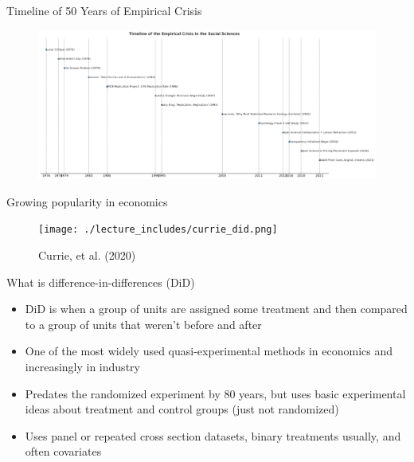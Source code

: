 \documentclass{beamer}
\begin{document}
\begin{frame}{Timeline of 50 Years of Empirical Crisis}

\begin{figure}
    \centering
    \includegraphics[height=0.9\textheight]{./lecture_includes/timeline}
\end{figure}

\end{frame}

\begin{frame}{Growing popularity in economics}

	\begin{figure}
	\caption{Currie, et al. (2020)}
	\texttt{[image: ./lecture\_includes/currie\_did.png]}
	\end{figure}


\end{frame}















\begin{frame}{What is difference-in-differences (DiD)}

\begin{itemize}
\item DiD is when a group of units are assigned some treatment and then compared to a group of units that weren't before and after
\item One of the most widely used quasi-experimental methods in economics and increasingly in industry
\item Predates the randomized experiment by 80 years, but uses basic experimental ideas about treatment and control groups (just not randomized)
\item Uses panel or repeated cross section datasets, binary treatments usually, and often covariates
\end{itemize}
\end{frame}
\end{document}
